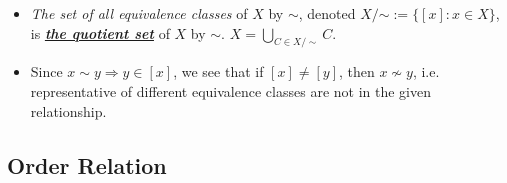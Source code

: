 \documentclass[11pt]{article}
\begin{document}
\begin{itemize}
\item \begin{definition}
\emph{The set of all equivalence classes} of $X$ by $\sim$, denoted $X/{\mathord {\sim }}:= \{[x]: x \in X \}$, is \underline{\emph{\textbf{the quotient set}}} of $X$ by $\sim$.  $X = \bigcup_{C \in X/\sim}C.$
\end{definition}

\item \begin{remark}
Since $x \sim y \Rightarrow y \in [x]$, we see that if $[x] \neq [y]$, then $x \not\sim y$, i.e. representative of different equivalence classes are not in the given relationship.
\end{remark}
\end{itemize}

\subsection{Order Relation}
\end{document}
